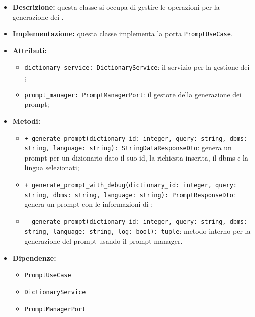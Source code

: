 \begin{itemize}
    \item \textbf{Descrizione:} questa classe si occupa di gestire le operazioni per la generazione dei .
    \item \textbf{Implementazione:} questa classe implementa la porta \texttt{PromptUseCase}. 
    \item \textbf{Attributi:}
    \begin{itemize}
        \item \texttt{dictionary\_service: DictionaryService}: il servizio per la gestione dei ;
        \item \texttt{prompt\_manager: PromptManagerPort}: il gestore della generazione dei prompt;
    \end{itemize}
    \item \textbf{Metodi:}
    \begin{itemize}
        \item \texttt{+ generate\_prompt(dictionary\_id: integer, query: string, dbms: string, language: string): StringDataResponseDto}: genera un prompt per un dizionario dato il suo id, la richiesta inserita, il dbms e la lingua selezionati;
        \item \texttt{+ generate\_prompt\_with\_debug(dictionary\_id: integer, query: string, dbms: string, language: string): PromptResponseDto}: genera un prompt con le informazioni di ;
        \item \texttt{- generate\_prompt(dictionary\_id: integer, query: string, dbms: string, language: string, log: bool): tuple}: metodo interno per la generazione del prompt usando il prompt manager.
    \end{itemize}
    \item \textbf{Dipendenze:}
    \begin{itemize}
        \item \texttt{PromptUseCase}
        \item \texttt{DictionaryService}
        \item \texttt{PromptManagerPort}
    \end{itemize}
\end{itemize}  